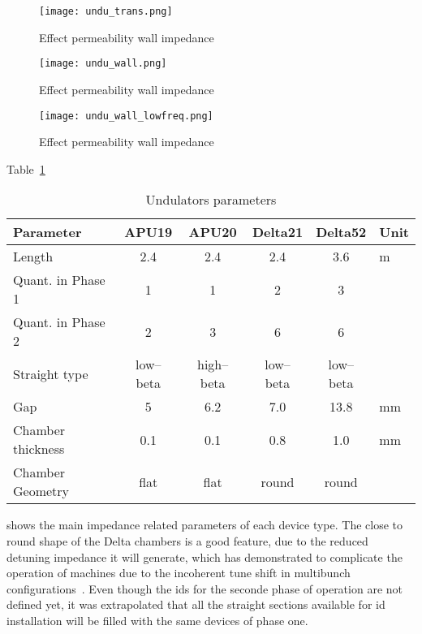     \begin{figure}
        \centering
        \texttt{[image: undu\_trans.png]}
        \caption{Effect permeability wall impedance}
        \label{fig:undu_trans}
    \end{figure}

    \begin{figure}
        \centering
        \texttt{[image: undu\_wall.png]}
        \caption{Effect permeability wall impedance}
        \label{fig:undu_wall}
    \end{figure}

    \begin{figure}
        \centering
        \texttt{[image: undu\_wall\_lowfreq.png]}
        \caption{Effect permeability wall impedance}
        \label{fig:undu_wall_lowfreq}
    \end{figure}

    Table~\ref{tab:undulators_parameters}
    \begin{table}
        \centering
        \caption{Undulators parameters}
        \label{tab:undulators_parameters}
        \begin{tabular}{lccccl}
            \toprule
            Parameter         & APU19     & APU20      & Delta21   & Delta52   &Unit\\
            \midrule
            Length            &  2.4      & 2.4        & 2.4       &  3.6      & \si{\meter} \\
            Quant. in Phase 1 &   1       &   1        &   2       &   3       & \\
            Quant. in Phase 2 &   2       &   3        &   6       &   6       & \\
            Straight type     & low--beta & high--beta & low--beta & low--beta & \\
            Gap               &   5       &   6.2      &   7.0     &  13.8     &  \si{\milli\meter} \\
            Chamber thickness &   0.1     &   0.1      &   0.8     &  1.0      & \si{\milli\meter} \\
            Chamber Geometry  &   flat    &   flat     &   round   &  round    & \\
            \bottomrule
        \end{tabular}
    \end{table}
    shows the main impedance related parameters of each device type. The close to round shape of the Delta chambers is a good feature, due to the reduced detuning impedance it will generate, which has demonstrated to complicate the operation of machines due to the incoherent tune shift in multibunch configurations~\cite{Nagaoka2001}. Even though the \gls{ids} for the seconde phase of operation are not defined yet, it was extrapolated that all the straight sections available for \gls{id} installation will be filled with the same devices of phase one.

